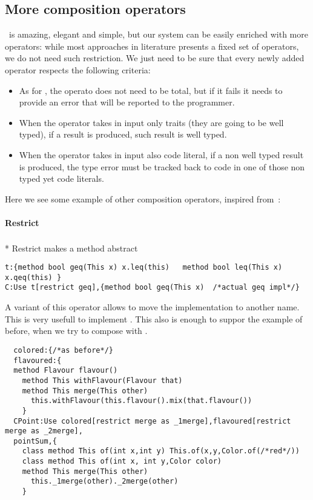 \subsection{More composition operators}
\use\ is amazing, elegant and simple, but our system can be easily enriched with more 
operators: while most approaches in literature presents a fixed set of operators, we do not need such restriction.
We just need to be sure that every newly added operator respects the following criteria:

\begin{itemize}
\item As for \use, the operato does not need to be total, but if it fails it needs to provide an error that will be reported to the programmer.
\item When the operator takes in input only traits (they are going to be well typed), if a result is produced,
 such result is well typed.
\item When the operator takes in input also code literal, if a non well typed result is produced,
the type error must be tracked back to code in one of those non typed yet code literals.
 \end{itemize}


Here we see some example of other composition operators, inspired from~\cite{servetto2014meta}:
\paragraph*{Restrict}${}_{}$\\*
Restrict makes a method abstract
\begin{lstlisting}
t:{method bool geq(This x) x.leq(this)   method bool leq(This x) x.qeq(this) }
C:Use t[restrict geq],{method bool geq(This x)  /*actual geq impl*/}
\end{lstlisting}

A variant of this operator allows to move the implementation to another name. This is very usefull to implement \Q@super@. This also is enough to suppor the example of before, when we try to compose \Q@colored@
with \Q@flavoured@.

\begin{lstlisting}
  colored:{/*as before*/}
  flavoured:{
  method Flavour flavour()
    method This withFlavour(Flavour that)
    method This merge(This other)
      this.withFlavour(this.flavour().mix(that.flavour())
    }
  CPoint:Use colored[restrict merge as _1merge],flavoured[restrict merge as _2merge],
  pointSum,{
    class method This of(int x,int y) This.of(x,y,Color.of(/*red*/))
    class method This of(int x, int y,Color color)
    method This merge(This other)
      this._1merge(other)._2merge(other)
    }
\end{lstlisting}

